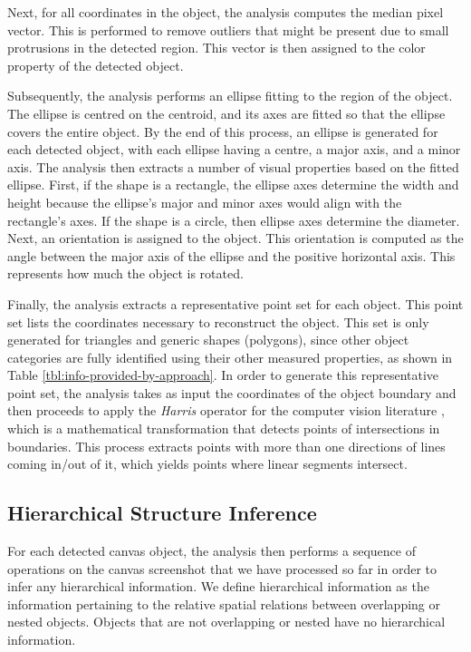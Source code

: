  Next, for all coordinates in the object, the analysis computes the median pixel vector. This is performed to remove outliers that might be present due to small protrusions in the detected region. This vector is then assigned to the color property of the detected object.

Subsequently, the analysis performs an ellipse fitting to the region of the object. The ellipse is centred on the centroid, and its axes are fitted so that the ellipse covers the entire object. By the end of this process, an ellipse is generated for each detected object, with each ellipse having a centre, a major axis, and a minor axis. The analysis then extracts a number of visual properties based on the fitted ellipse. First, if the shape is a rectangle, the ellipse axes determine the width and height because the ellipse's major and minor axes would align with the rectangle's axes. If the shape is a circle, then ellipse axes determine the diameter. Next, an orientation is assigned to the object. This orientation is computed as the angle between the major axis of the ellipse and the positive horizontal axis. This represents how much the object is rotated. 


Finally, the analysis extracts a representative point set for each object. This point set lists the coordinates necessary to reconstruct the object. This set is only generated for triangles and generic shapes (polygons), since other object categories are fully identified using their other measured properties, as shown in Table \ref{tbl:info-provided-by-approach}. 
In order to generate this representative point set, the analysis takes as input the coordinates of the object boundary and then proceeds to apply the \emph{Harris} operator for the computer vision literature \cite{ryu2011formula}, which is a mathematical transformation that detects points of intersections in boundaries. This process extracts points with more than one directions of lines coming in/out of it, which yields points where linear segments intersect. 
 
\subsection{Hierarchical Structure Inference}

For each detected canvas object, the analysis then performs a sequence of operations on the canvas screenshot that we have processed so far in order to infer any hierarchical information. We define hierarchical information as the information pertaining to the relative spatial relations between overlapping or nested objects. Objects that are not overlapping or nested have no hierarchical information.

